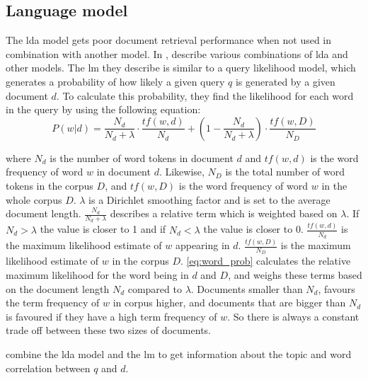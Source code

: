 \subsection{Language model}\label{sec:lm}
The \gls{lda} model gets poor document retrieval performance when not used in combination with another model\cite{yang2009topic}.
In \cite{yang2009topic}, \citeauthor{yang2009topic} describe various combinations of \gls{lda} and other models. 
The \acrlong{lm} they describe is similar to a query likelihood model, which generates a probability of how likely a given query $q$ is generated by a given document $d$.
To calculate this probability, they find the likelihood for each word in the query by using the following equation:
\begin{equation}\label{eq:word_prob}
	P(w|d) = \frac{N_d}{N_d + \lambda} \cdot \frac{tf(w,d)}{N_d} + (1 - \frac{N_d}{N_d + \lambda}) \cdot \frac{tf(w,D)}{N_D}
\end{equation}

where $N_d$ is the number of word tokens in document $d$ and $tf(w,d)$ is the word frequency of word $w$ in document $d$. Likewise, $N_D$ is the total number of word tokens in the corpus $D$, and $tf(w,D)$ is the word frequency of word $w$ in the whole corpus $D$. $\lambda$ is a Dirichlet smoothing factor and is set to the average document length.
$ \frac{N_d}{N_d + \lambda} $ describes a relative term which is weighted based on $ \lambda $. If $N_d > \lambda$ the value is closer to 1 and if $ N_d < \lambda $ the value is closer to 0.
$\frac{tf(w,d)}{N_d}$ is the maximum likelihood estimate of $w$ appearing in $d$.
$\frac{tf(w,D)}{N_D}$ is the maximum likelihood estimate of $w$ in the corpus $D$.
\autoref{eq:word_prob} calculates the relative maximum likelihood for the word being in $ d $ and $ D $, and weighs these terms based on the document length $N_d$ compared to $\lambda$.
Documents smaller than $N_d$, favours the term frequency of $w$ in corpus higher, and documents that are bigger than $N_d$ is favoured if they have a high term frequency of $w$.
So there is always a constant trade off between these two sizes of documents.

\cite{yang2009topic} combine the \gls{lda} model and the \gls{lm} to get information about the topic and word correlation between $q$ and $d$.

